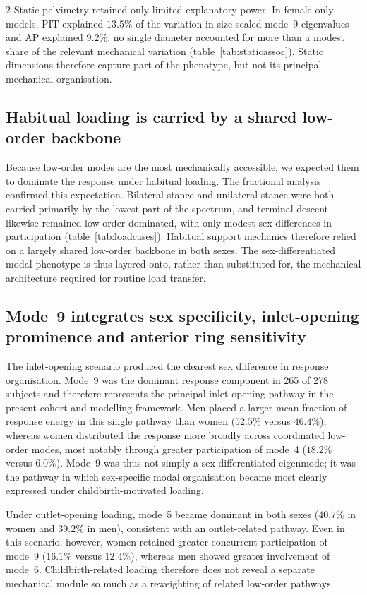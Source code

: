 \documentclass[openacc]{rsproca_new}
\begin{document}
\begin{multicols}{2}
Static pelvimetry retained only limited explanatory power. In female-only models, PIT explained $13.5\%$ of the variation in size-scaled mode~9 eigenvalues and AP explained $9.2\%$; no single diameter accounted for more than a modest share of the relevant mechanical variation (table~\ref{tab:staticassoc}). Static dimensions therefore capture part of the phenotype, but not its principal mechanical organisation.

\subsection{Habitual loading is carried by a shared low-order backbone}

Because low-order modes are the most mechanically accessible, we expected them to dominate the response under habitual loading. The fractional analysis confirmed this expectation. Bilateral stance and unilateral stance were both carried primarily by the lowest part of the spectrum, and terminal descent likewise remained low-order dominated, with only modest sex differences in participation (table~\ref{tab:loadcases}). Habitual support mechanics therefore relied on a largely shared low-order backbone in both sexes. The sex-differentiated modal phenotype is thus layered onto, rather than substituted for, the mechanical architecture required for routine load transfer.

\subsection{Mode~9 integrates sex specificity, inlet-opening prominence and anterior ring sensitivity}

The inlet-opening scenario produced the clearest sex difference in response organisation. Mode~9 was the dominant response component in 265 of 278 subjects and therefore represents the principal inlet-opening pathway in the present cohort and modelling framework. Men placed a larger mean fraction of response energy in this single pathway than women ($52.5\%$ versus $46.4\%$), whereas women distributed the response more broadly across coordinated low-order modes, most notably through greater participation of mode~4 ($18.2\%$ versus $6.0\%$). Mode~9 was thus not simply a sex-differentiated eigenmode; it was the pathway in which sex-specific modal organisation became most clearly expressed under childbirth-motivated loading.

Under outlet-opening loading, mode~5 became dominant in both sexes ($40.7\%$ in women and $39.2\%$ in men), consistent with an outlet-related pathway. Even in this scenario, however, women retained greater concurrent participation of mode~9 ($16.1\%$ versus $12.4\%$), whereas men showed greater involvement of mode~6. Childbirth-related loading therefore does not reveal a separate mechanical module so much as a reweighting of related low-order pathways.


\end{multicols}
\end{document}
